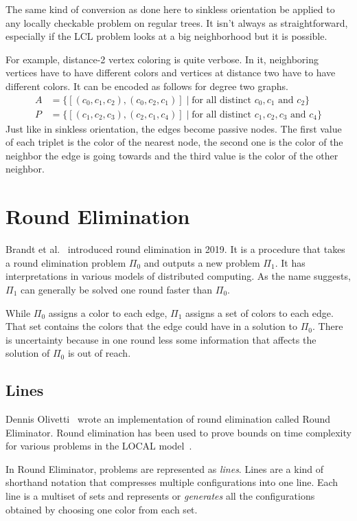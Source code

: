 \documentclass[english, 12pt, a4paper, sci, a-1b, online]{aaltothesis}
\begin{document}
The same kind of conversion as done here to sinkless orientation be applied to any locally checkable problem on regular trees. It isn't always as straightforward, especially if the LCL problem looks at a big neighborhood but it is possible.

For example, distance-2 vertex coloring is quite verbose. In it, neighboring vertices have to have different colors and vertices at distance two have to have different colors. It can be encoded as follows for degree two graphs.
\begin{align*}
A &= \{[(c_0, c_1, c_2), (c_0, c_2, c_1)] \mid \text{for all distinct } c_0, c_1\text{ and }c_2 \} \\
P &= \{[(c_1, c_2, c_3), (c_2, c_1, c_4)] \mid \text{for all distinct } c_1, c_2, c_3\text{ and }c_4 \}
\end{align*}
Just like in sinkless orientation, the edges become passive nodes. The first value of each triplet is the color of the nearest node, the second one is the color of the neighbor the edge is going towards and the third value is the color of the other neighbor.

\section{Round Elimination}\label{resection}

Brandt et al.~\cite{speedup} introduced round elimination in 2019. It is a procedure that takes a round elimination problem $\Pi_0$ and outputs a new problem $\Pi_1$. It has interpretations in various models of distributed computing. As the name suggests, $\Pi_1$ can generally be solved one round faster than $\Pi_0$.

While $\Pi_0$ assigns a color to each edge, $\Pi_1$ assigns a set of colors to each edge. That set contains the colors that the edge could have in a solution to $\Pi_0$. There is uncertainty because in one round less some information that affects the solution of $\Pi_0$ is out of reach.

\subsection{Lines}

Dennis Olivetti~\cite{RE} wrote an implementation of round elimination called Round Eliminator. Round elimination has been used to prove bounds on time complexity for various problems in the LOCAL model~\cite{tc1, tc2, tc3}.

In Round Eliminator, problems are represented as \emph{lines}. Lines are a kind of shorthand notation that compresses multiple configurations into one line. Each line is a multiset of sets and represents or \emph{generates} all the configurations obtained by choosing one color from each set.~\cite{RE}
\end{document}
